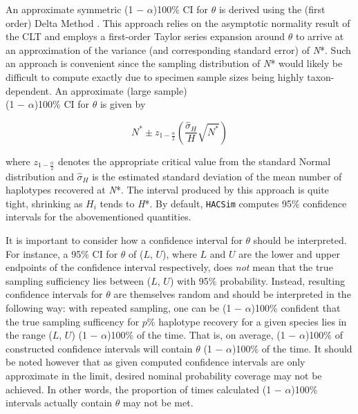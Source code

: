 An approximate symmetric (1 $-$ $\alpha$)100\% CI for $\theta$ is derived using the (first order) Delta Method \cite{casella2002statistical}. This approach relies on the asymptotic normality result of the CLT and employs a first-order Taylor series expansion around $\theta$ to arrive at an approximation of the variance (and corresponding standard error) of \textit{N}*. Such an approach is convenient since the sampling distribution of \textit{N}* would likely be difficult to compute exactly due to specimen sample sizes being highly taxon-dependent. An approximate (large sample) \\ (1 $-$ $\alpha$)100\% CI for $\theta$ is given by

\begin{equation}
N^* \pm z_{1-\frac{\alpha}{2}}\left(\frac{\hat{\sigma}_{H}}{H}\sqrt{N^*}\right)
\end{equation}

\vspace{5mm}

\noindent where $z_{1-\frac{\alpha}{2}}$ denotes the appropriate critical value from the standard Normal distribution and $\hat{\sigma}_{H}$ is the estimated standard deviation of the mean number of haplotypes recovered at \textit{N}*. The interval produced by this approach is quite tight, shrinking as $H_i$ tends to \textit{H}*. By default, {\tt HACSim} computes 95\% confidence intervals for the abovementioned quantities. 

It is important to consider how a confidence interval for $\theta$ should be interpreted. For instance, a 95\% CI for $\theta$ of ($L$, $U$), where $L$ and $U$ are the lower and upper endpoints of the confidence interval respectively, does \textit{not} mean that the true sampling sufficiency lies between ($L$, $U$) with 95\% probability. Instead, resulting confidence intervals for $\theta$ are themselves random and should be interpreted in the following way: with repeated sampling, one can be (1 $-$ $\alpha$)100\% confident that the true sampling sufficency for $p$\% haplotype recovery for a given species lies in the range ($L$, $U$) (1 $-$ $\alpha$)100\% of the time. That is, on average, (1 $-$ $\alpha$)100\% of constructed confidence intervals will contain $\theta$ (1 $-$ $\alpha$)100\% of the time. It should be noted however that as given computed confidence intervals are only approximate in the limit, desired nominal probability coverage may not be achieved. In other words, the proportion of times calculated (1 $-$ $\alpha$)100\% intervals actually contain $\theta$ may not be met.

